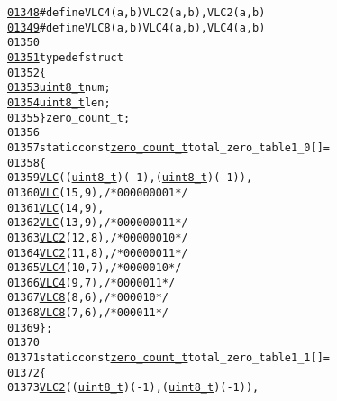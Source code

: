 \begin{footnotesize}
\begin{alltt}
\hypertarget{vlc_8h_source_l01348}{}\hyperlink{vlc_8h_a1bc626fcc46afa5b916e5441648a3942}{01348} \textcolor{preprocessor}{}\textcolor{preprocessor}{#define VLC4(a, b) VLC2(a, b), VLC2(a, b)}
\hypertarget{vlc_8h_source_l01349}{}\hyperlink{vlc_8h_a0a94088f44f593387fb86112a6c7da9c}{01349} \textcolor{preprocessor}{}\textcolor{preprocessor}{#define VLC8(a, b) VLC4(a, b), VLC4(a, b)}
01350 \textcolor{preprocessor}{}
\hypertarget{vlc_8h_source_l01351}{}\hyperlink{structzero__count__t}{01351} \textcolor{keyword}{typedef} \textcolor{keyword}{struct  }
01352 \{
\hypertarget{vlc_8h_source_l01353}{}\hyperlink{structzero__count__t_a421978d0cc700d1b484dea8dff38f807}{01353}         \hyperlink{_types_8h_a363e4d606232036a6b89060813c45489}{uint8_t} num;
\hypertarget{vlc_8h_source_l01354}{}\hyperlink{structzero__count__t_a6e0084b086508dedc5d54fe27bc7eb96}{01354}         \hyperlink{_types_8h_a363e4d606232036a6b89060813c45489}{uint8_t} len;
01355 \} \hyperlink{structzero__count__t}{zero_count_t};
01356 
01357 \textcolor{keyword}{static} \textcolor{keyword}{const} \hyperlink{structzero__count__t}{zero_count_t} total\_zero\_table1\_0[] = 
01358 \{
01359         \hyperlink{vlc_8h_a7f3572774a720fd9b4bc3b1a0b65082f}{VLC}((\hyperlink{_types_8h_a363e4d606232036a6b89060813c45489}{uint8_t})(-1), (\hyperlink{_types_8h_a363e4d606232036a6b89060813c45489}{uint8_t})(-1)),
01360         \hyperlink{vlc_8h_a7f3572774a720fd9b4bc3b1a0b65082f}{VLC}(15, 9), \textcolor{comment}{/* 0000 0000 1 */}
01361         \hyperlink{vlc_8h_a7f3572774a720fd9b4bc3b1a0b65082f}{VLC}(14, 9),
01362         \hyperlink{vlc_8h_a7f3572774a720fd9b4bc3b1a0b65082f}{VLC}(13, 9), \textcolor{comment}{/* 0000 0001 1 */}
01363         \hyperlink{vlc_8h_ad3cda36b9c6132357c7f7de5e52a6c93}{VLC2}(12, 8),\textcolor{comment}{/* 0000 0010 */}
01364         \hyperlink{vlc_8h_ad3cda36b9c6132357c7f7de5e52a6c93}{VLC2}(11, 8),\textcolor{comment}{/* 0000 0011 */}
01365         \hyperlink{vlc_8h_a02cdc921d8f03450b12879e8afb222cb}{VLC4}(10, 7),\textcolor{comment}{/* 0000 010 */}
01366         \hyperlink{vlc_8h_a02cdc921d8f03450b12879e8afb222cb}{VLC4}(9, 7), \textcolor{comment}{/* 0000 011 */}
01367         \hyperlink{vlc_8h_a0a94088f44f593387fb86112a6c7da9c}{VLC8}(8, 6), \textcolor{comment}{/* 0000 10 */}
01368         \hyperlink{vlc_8h_a0a94088f44f593387fb86112a6c7da9c}{VLC8}(7, 6), \textcolor{comment}{/* 0000 11 */}
01369 \};
01370 
01371 \textcolor{keyword}{static} \textcolor{keyword}{const} \hyperlink{structzero__count__t}{zero_count_t} total\_zero\_table1\_1[] = 
01372 \{
01373         \hyperlink{vlc_8h_ad3cda36b9c6132357c7f7de5e52a6c93}{VLC2}((\hyperlink{_types_8h_a363e4d606232036a6b89060813c45489}{uint8_t})(-1), (\hyperlink{_types_8h_a363e4d606232036a6b89060813c45489}{uint8_t})(-1)),

\end{alltt}
\end{footnotesize}
